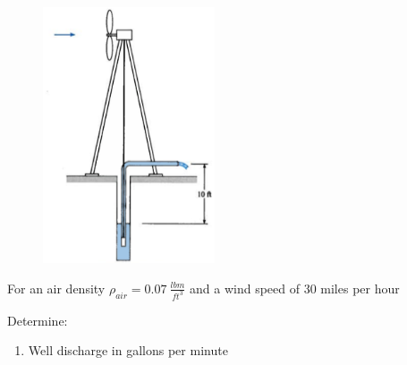 \documentclass[12pt]{article}
\begin{document}
\begin{enumerate}
\begin{figure}[htbp] %
   \centering
   \includegraphics[width=2in]{windmill.png} 
   \caption{}
   \label{fig:windmill}
\end{figure}

For an air density $\rho_{air}=0.07~\frac{lbm}{ft^3}$ and a wind speed of 30 miles per hour

Determine:
\begin{enumerate}
\item Well discharge in gallons per minute 
\end{enumerate}
\clearpage




\end{enumerate}
\end{document}
